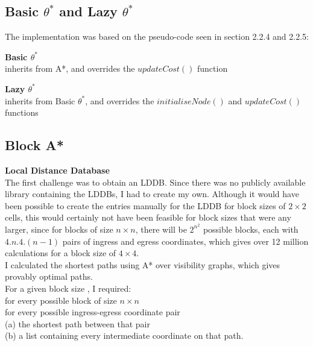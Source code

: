 \documentclass[12pt,twoside,notitlepage]{report}
\begin{document}
\subsection {Basic $\theta ^{*}$ and Lazy $\theta ^{*}$}

The implementation was based on the pseudo-code seen in section 2.2.4 and 2.2.5: 
\begin{description}
\item{\bf Basic $\theta ^{*}$}\\ \hfill inherits from A*, and overrides the $updateCost()$ function
\item {\bf Lazy $\theta ^{*}$ }\\ \hfill inherits from Basic $\theta ^{*}$, and overrides the $initialiseNode()$ and $updateCost()$ functions
\end{description}

\subsection {Block A*}

{\bf Local Distance Database}\\

\noindent
The first challenge was to obtain an LDDB. Since there was no publicly available library containing the LDDBs, I had to create my own. Although it would have been possible to create the entries manually for the LDDB for block sizes of $2 \times 2$ cells, this would certainly not have been feasible for block sizes that were any larger, since for blocks of size {$n \times n$}, there will be $2^{n^{2}}$ possible blocks, each with $4.n.4.(n-1)$ pairs of ingress and egress coordinates, which gives over 12 million calculations for a block size of $4 \times 4$.\\

\noindent
I calculated the shortest paths using A* over visibility graphs, which gives provably optimal paths.\\

\noindent
For a given block size , I required:\\
\indent for every possible block of size {$n \times n$}\\
\indent \indent for every possible ingress-egress coordinate pair\\
\indent \indent \indent (a) the shortest path between that pair\\
\indent \indent \indent (b) a list containing every intermediate coordinate on that path.\\
\end{document}
